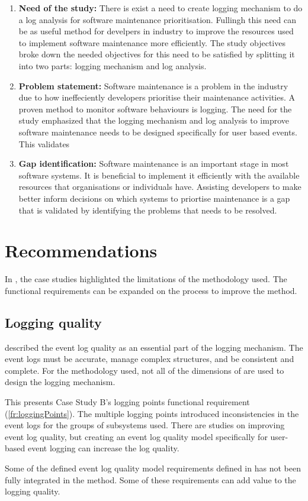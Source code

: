 \begin{enumerate}[label=\textbf{\Roman*.}]
	\item \textbf{Need of the study:} There is exist a need to create logging mechanism to do a log analysis for software maintenance prioritisation. Fullingh this need can be as useful method for develpers in industry to improve the resources used to implement software maintenance more efficiently. The study objectives broke down the needed objectives for this need to be satisfied by splitting it into two parts: logging mechanism and log analysis. 
	\item \textbf{Problem statement:} Software maintenance is a problem in the industry due to how ineffeciently developers prioritise their maintenance activities. A proven method to monitor software behaviours is logging. The need for the study emphasized that the logging mechanism and log analysis to improve software maintenance needs to be designed specifically for user based events. This validates 
	\item \textbf{Gap identification:} Software maintenance is an important stage in most software systems. It is beneficial to implement it efficiently with the available resources that organisations or individuals have. Assisting developers to make better inform decisions on which systems to priortise maintenance is a gap that is validated by identifying the problems that needs to be resolved.
\end{enumerate}

\section{Recommendations}
In , the case studies highlighted the limitations of the methodology used. The functional requirements can be expanded on the process to improve the method.

\subsection{Logging quality}
 described the event log quality as an essential part of the logging mechanism. The event logs must be accurate, manage complex structures, and be consistent and complete. For the methodology used, not all of the dimensions of  are used to design the logging mechanism.\par This presents Case Study B's logging points functional requirement (\ref{fr:loggingPoints}). The multiple logging points introduced inconsistencies in the event logs for the groups of subsystems used. There are studies on improving event log quality, but creating an event log quality model specifically for user-based event logging can increase the log quality. \par Some of the defined event log quality model requirements defined in  has not been fully integrated in the method. Some of these requirements can add value to the logging quality.

